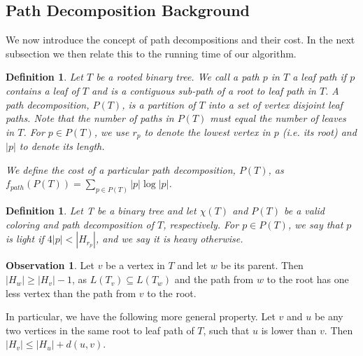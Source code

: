 \documentclass[11pt]{article}
\newtheorem{definition}[theorem]{Definition}
\theoremstyle{definition}
\newtheorem{observation}{Observation}
\begin{document}
\subsection{Path Decomposition Background}
We now introduce the concept of path decompositions and their cost.  In the next subsection we then relate this to the
running time of our algorithm.

\begin{definition}
 Let $T$ be a rooted binary tree.  We call a path $p$ in $T$ a \emph{leaf path} if $p$ contains a leaf of $T$ and 
 is a contiguous sub-path of a root to leaf path in $T$.  A \emph{path decomposition}, $P(T)$, is a partition of $T$ into 
 a set of vertex disjoint leaf paths.  Note that the number of paths in $P(T)$ must equal the number of leaves in $T$.
 For $p\in P(T)$, we use $r_p$ to denote the lowest vertex in $p$ (i.e. its root) and 
 $|p|$ to denote its length.
 
 We define the cost of a particular path decomposition, $P(T)$, as $f_{path}(P(T)) = \sum_{p\in P(T)} |p| \log |p|$.
\end{definition}


\begin{definition}
 Let T be a binary tree and let $\chi(T)$ and $P(T)$ be a valid coloring and path decomposition of $T$, respectively.  
 For $p\in P(T)$, we say that $p$ is \emph{light} if $4 |p| < |H_{r_p}|$, and we say it is \emph{heavy} otherwise.
\end{definition}

\begin{observation}
\label{obs:decrease}
 Let $v$ be a vertex in $T$ and let $w$ be its parent.  Then $|H_w| \geq |H_v| -1$, as $L(T_v) \subseteq L(T_w)$ and the path from 
 $w$ to the root has one less vertex than the path from $v$ to the root.
 
 In particular, we have the following more general property.
 Let $v$ and $u$ be any two vertices in the same root to leaf path of $T$, such that $u$ is lower than $v$.  
 Then $|H_v| \leq |H_u| + d(u,v)$. 
\end{observation}
\end{document}
